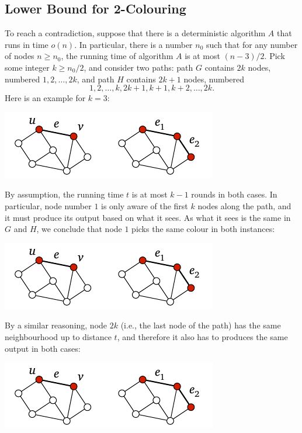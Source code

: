 \subsection{Lower Bound for 2-Colouring}

To reach a contradiction, suppose that there is a deterministic algorithm $A$ that runs in time $o(n)$. In particular, there is a number $n_0$ such that for any number of nodes $n \ge n_0$, the running time of algorithm $A$ is at most $(n-3)/2$. Pick some integer $k \ge n_0/2$, and consider two paths: path $G$ contains $2k$ nodes, numbered $1,2,\dotsc,2k$, and path $H$ contains $2k+1$ nodes, numbered \[1,2,\dotsc,k,2k+1,k+1,k+2,\dotsc,2k.\] Here is an example for $k = 3$:
\begin{center}
    \includegraphics[page=\PIntroLbTwoA]{figs.pdf}
\end{center}
By assumption, the running time $t$ is at most $k-1$ rounds in both cases. In particular, node number $1$ is only aware of the first $k$ nodes along the path, and it must produce its output based on what it sees. As what it sees is the same in $G$ and $H$, we conclude that node $1$ picks the same colour in both instances:
\begin{center}
    \includegraphics[page=\PIntroLbTwoB]{figs.pdf}
\end{center}
By a similar reasoning, node $2k$ (i.e., the last node of the path) has the same neighbourhood up to distance $t$, and therefore it also has to produces the same output in both cases:
\begin{center}
    \includegraphics[page=\PIntroLbTwoC]{figs.pdf}
\end{center}
